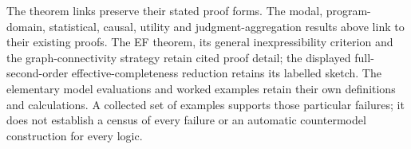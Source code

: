 The theorem links preserve their stated proof forms. The modal, program-domain,
statistical, causal, utility and judgment-aggregation results above link to
their existing proofs. The EF theorem, its general inexpressibility criterion
and the graph-connectivity strategy retain cited proof detail; the displayed
full-second-order effective-completeness reduction retains its labelled sketch.
The elementary model evaluations and worked examples retain their own
definitions and calculations. A collected set of examples supports those
particular failures; it does not establish a census of every failure or an
automatic countermodel construction for every logic.
